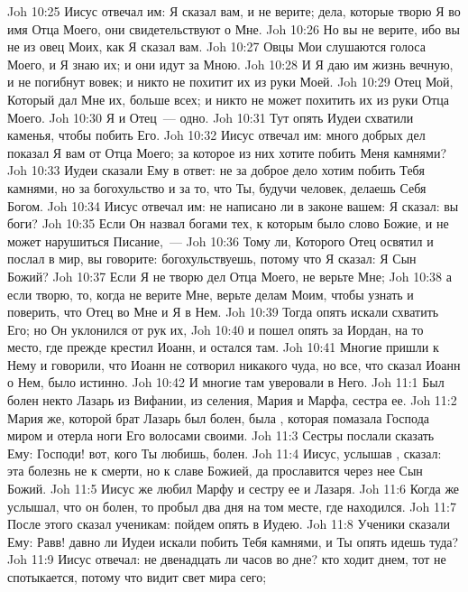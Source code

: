 \vs Joh 10:25 Иисус отвечал им: Я сказал вам, и не верите; дела, которые творю Я во имя Отца Моего, они свидетельствуют о Мне.
\vs Joh 10:26 Но вы не верите, ибо вы не из овец Моих, как Я сказал вам.
\vs Joh 10:27 Овцы Мои слушаются голоса Моего, и Я знаю их; и они идут за Мною.
\vs Joh 10:28 И Я даю им жизнь вечную, и не погибнут вовек; и никто не похитит их из руки Моей.
\vs Joh 10:29 Отец Мой, Который дал Мне их, больше всех; и никто не может похитить их из руки Отца Моего.
\vs Joh 10:30 Я и Отец~--- одно.
\vs Joh 10:31 Тут опять Иудеи схватили каменья, чтобы побить Его.
\vs Joh 10:32 Иисус отвечал им: много добрых дел показал Я вам от Отца Моего; за которое из них хотите побить Меня камнями?
\vs Joh 10:33 Иудеи сказали Ему в ответ: не за доброе дело хотим побить Тебя камнями, но за богохульство и за то, что Ты, будучи человек, делаешь Себя Богом.
\vs Joh 10:34 Иисус отвечал им: не написано ли в законе вашем: Я сказал: вы боги?
\vs Joh 10:35 Если Он назвал богами тех, к которым было слово Божие, и не может нарушиться Писание,~---
\vs Joh 10:36 Тому ли, Которого Отец освятил и послал в мир, вы говорите: богохульствуешь, потому что Я сказал: Я Сын Божий?
\vs Joh 10:37 Если Я не творю дел Отца Моего, не верьте Мне;
\vs Joh 10:38 а если творю, то, когда не верите Мне, верьте делам Моим, чтобы узнать и поверить, что Отец во Мне и Я в Нем.
\vs Joh 10:39 Тогда опять искали схватить Его; но Он уклонился от рук их,
\vs Joh 10:40 и пошел опять за Иордан, на то место, где прежде крестил Иоанн, и остался там.
\vs Joh 10:41 Многие пришли к Нему и говорили, что Иоанн не сотворил никакого чуда, но все, что сказал Иоанн о Нем, было истинно.
\vs Joh 10:42 И многие там уверовали в Него.
\vs Joh 11:1 Был болен некто Лазарь из Вифании, из селения,  Мария и Марфа, сестра ее.
\vs Joh 11:2 Мария же, которой брат Лазарь был болен, была , которая помазала Господа миром и отерла ноги Его волосами своими.
\vs Joh 11:3 Сестры послали сказать Ему: Господи! вот, кого Ты любишь, болен.
\vs Joh 11:4 Иисус, услышав , сказал: эта болезнь не к смерти, но к славе Божией, да прославится через нее Сын Божий.
\vs Joh 11:5 Иисус же любил Марфу и сестру ее и Лазаря.
\vs Joh 11:6 Когда же услышал, что он болен, то пробыл два дня на том месте, где находился.
\vs Joh 11:7 После этого сказал ученикам: пойдем опять в Иудею.
\vs Joh 11:8 Ученики сказали Ему: Равв! давно ли Иудеи искали побить Тебя камнями, и Ты опять идешь туда?
\vs Joh 11:9 Иисус отвечал: не двенадцать ли часов во дне? кто ходит днем, тот не спотыкается, потому что видит свет мира сего;
